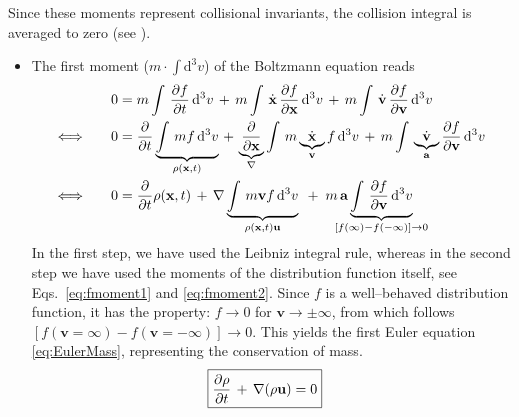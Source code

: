 Since these moments represent collisional invariants, the collision integral is averaged to zero (see ).
\begin{itemize}
 \item The first moment ($m\cdot\int \mathrm{d}^{3}v$) of the Boltzmann equation reads
 \begin{align*}
  &0 = m \int\,\frac{\partial f}{\partial t}\,\mathrm{d}^{3}v \,+\, m \int\,\dot{\textbf{x}}\,\frac{\partial f}{\partial \textbf{x}}\,\mathrm{d}^{3}v \,+\, m \int\,\dot{\textbf{v}}\,\frac{\partial f}{\partial \textbf{v}}\,\mathrm{d}^{3}v \\
  \Longleftrightarrow\qquad
  &0 = \frac{\partial}{\partial t} \underbrace{ \int\,m  f\,\mathrm{d}^{3}v }_{\rho(\textbf{x}, t)} \,+\, \underbrace{ \frac{\partial}{\partial \textbf{x}} }_{\nabla} \int\,m \underbrace{ \dot{\textbf{x}} }_{\textbf{v}} f\,\mathrm{d}^{3}v \,+\, m \int\,\underbrace{ \dot{\textbf{v}} }_{\textbf{a}} \frac{\partial f}{\partial \textbf{v}}\,\mathrm{d}^{3}v \\
  \Longleftrightarrow\qquad
  &0 = \frac{\partial}{\partial t} \rho(\textbf{x}, t) \,+\, \nabla \underbrace{ \int\,m \textbf{v} f\,\mathrm{d}^{3}v }_{\rho(\textbf{x}, t)  \textbf{u}} \enskip+\enskip m\,\textbf{a} \underbrace{ \int\,\frac{\partial f}{\partial \textbf{v}}\,\mathrm{d}^{3}v }_{ \mathclap{[f(\infty) - f(-\infty)] \rightarrow 0} }
 \end{align*}
 In the first step, we have used the Leibniz integral rule, whereas in the second step we have used the moments of the distribution function itself, see Eqs.~\eqref{eq:fmoment1} and \eqref{eq:fmoment2}.
 Since $f$ is a well--behaved distribution function, it has the property: $f \rightarrow 0$ for $\textbf{v} \rightarrow \pm \infty$, from which follows $[f(\textbf{v} = \infty) - f(\textbf{v} = -\infty)] \rightarrow 0$.
 This yields the first Euler equation \eqref{eq:EulerMass}, representing the conservation of mass.
 \begin{align*}
  \Aboxed{\frac{\partial\rho}{\partial t} \,+\, \nabla(\rho\textbf{u}) = 0}
 \end{align*}


\end{itemize}
